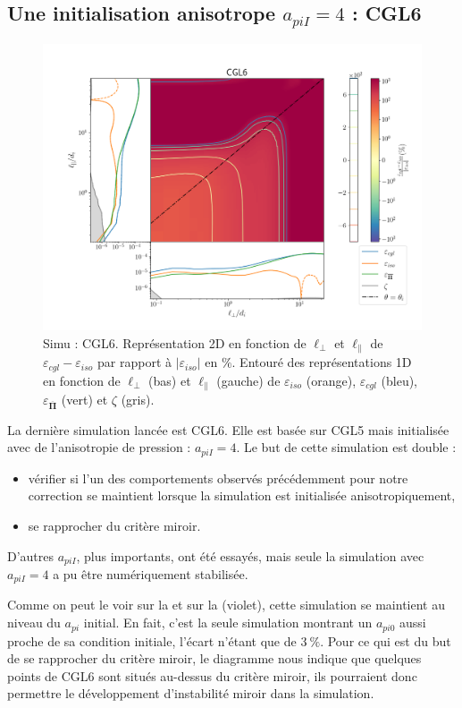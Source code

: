 \subsection{Une initialisation anisotrope $a_{piI} = 4$ : CGL6}
\begin{figure}[!ht]
 \centering
\includegraphics[width=0.95\linewidth,trim=1cm 1cm 0cm 2cm, clip=true]{./Part_3/images_ch3/CGL6_panel_isocgl_percent}
\cprotect\caption{Simu : CGL6. Représentation 2D en fonction de $\ell_{\perp}$ et $\ell_{\parallel}$ de $\varepsilon_{cgl}-\varepsilon_{iso}$ par rapport à $|\varepsilon_{iso}|$ en $\%$. Entouré des représentations 1D en fonction de $\ell_{\perp}$ (bas) et $\ell_{\parallel}$ (gauche) de $\varepsilon_{iso}$ (orange), $\varepsilon_{cgl}$ (bleu), $\varepsilon_{\overline{\boldsymbol{\Pi}}} $ (vert) et $\zeta$ (gris). }
\label{fig:trip_CGL6}
\end{figure}
La dernière simulation lancée est CGL6. Elle est basée sur CGL5 mais initialisée avec de l'anisotropie de pression : $a_{piI} = 4 $. Le but de cette simulation est double :
\begin{itemize}
    \item vérifier si l'un des comportements observés précédemment pour notre correction se maintient lorsque la simulation est initialisée anisotropiquement,
    \item se rapprocher du critère miroir.
\end{itemize}
D'autres $a_{piI}$, plus importants, ont été essayés, mais seule la simulation avec $a_{piI} = 4 $ a pu être numériquement stabilisée. 


Comme on peut le voir sur la  et sur la  (violet), cette simulation se maintient au niveau du $a_{pi}$ initial. En fait, c'est la seule simulation montrant un $a_{pi0}$ aussi proche de sa condition initiale, l'écart n'étant que de $\SI{3}{\%}$.  Pour ce qui est du but de se rapprocher du critère miroir, le diagramme nous indique que quelques points de CGL6 sont situés au-dessus du critère miroir, ils pourraient donc permettre le développement d'instabilité miroir dans la simulation. 

